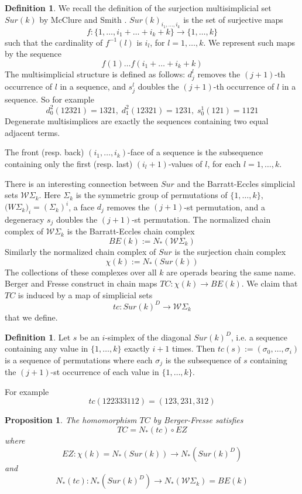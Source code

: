 \documentclass[a4paper,11pt]{article}
\newtheorem{proposition}[theorem]{Proposition}
\theoremstyle{remark}
\newtheorem{Remark}[theorem]{\textbf{Remark}}
\theoremstyle{definition}
\newtheorem{definition}[theorem]{Definition}
\begin{document}
\begin{definition}
We recall the definition of the surjection multisimplicial set $Sur(k)$ by McClure and Smith \cite{MS}.
$Sur(k)_{i_1,\dots,i_k}$ is the set of surjective maps $$f:\{1,\dots,i_1+\dots+i_k+k\} \to  \{1,\dots,k\}$$ such that
the cardinality of $f^{-1}(l)$ is $i_l$, for $l=1,\dots,k$. We represent such maps by the sequence
$$f(1) \dots f(i_1+\dots+i_k+k)$$ The multisimplicial structure is defined as follows:
$d^l_j$ removes the $(j+1)$-th occurrence of $l$ in a sequence, and 
$s^l_j$ doubles the $(j+1)$-th occurrence of $l$ in a sequence. 
So for example $$d^2_0(12321)=1321, \; d^2_1(12321)=1231 , \; s^1_0(121)=1121$$
Degenerate multisimplices are exactly the sequences containing two equal adjacent terms.

The front  (resp. back) $(i_1,\dots,i_k)$-face of a sequence is the subsequence containing only the first (resp. last) 
$(i_l+1)$-values of $l$, for each
$l=1,\dots,k$.
\end{definition}

There is an interesting connection between $Sur$ and the Barratt-Eccles simplicial sets $\mathcal{W}\Sigma_k$. Here $\Sigma_k$ is the symmetric group
of permutations of $\{1,\dots,k\}$,
$\mathcal({W}\Sigma_k)_i=(\Sigma_k)^i$, a face $d_{j}$ removes the $(j+1)$-st permutation, and a degeneracy $s_j$ doubles the $(j+1)$-st permutation. 
The normalized chain complex of $\mathcal{W}\Sigma_k$ is the Barratt-Eccles chain complex $$BE(k):=N_*(\mathcal{W}\Sigma_k)$$ Similarly the normalized chain complex 
of $Sur$ is the surjection chain complex $$\chi(k):=N_*(Sur(k))$$ The collections of these complexes over all $k$ are operads bearing the same name.
Berger and Fresse construct in \cite{BFsmall} chain maps $TC:\chi(k) \to BE(k)$. We claim that $TC$ is induced by a map of simplicial sets
$$tc: Sur(k)^D \to \mathcal{W}\Sigma_k$$ that we define. 
\begin{definition}
Let $s$ be an $i$-simplex  of the diagonal $Sur(k)^D$, i.e. a sequence containing any value in $\{1,\dots,k\}$ exactly $i+1$ times. 
Then $tc(s):=(\sigma_0,\dots,\sigma_i)$ is a sequence of permutations where each $\sigma_j$ is the subsequence of $s$ containing the $(j+1)$-st occurrence of each value in $\{1,\dots,k\}$.
 \end{definition}

 For example 
 $$tc(122333112)=(123,231,312)$$

\begin{proposition} 
The homomorphism $TC$ by Berger-Fresse satisfies
$$TC=N_*(tc) \circ EZ$$ where $$EZ: \chi(k) = N_*(Sur(k)) \to N_*(Sur(k)^D)$$ and $$N_*(tc):N_*(Sur(k)^D) \to N_*(\mathcal{W}\Sigma_k)=BE(k)$$
\end{proposition}
\end{document}
